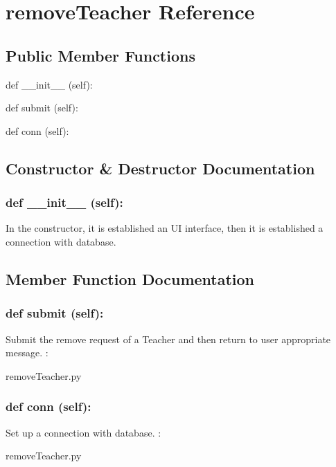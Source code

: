 \hypertarget{removeTeacher}{\section{removeTeacher Reference}
\label{removeTeacher}
}
\subsection*{Public Member Functions}
\begin{DoxyCompactItemize}
\item 
def {\_\_init\_\_} (self):
\item 
def {submit} (self):
\item 
def {conn} (self):
\end{DoxyCompactItemize}

\subsection{Constructor \& Destructor Documentation}
\hypertarget{class_poly_aa3def076b74bed67904976ad4f9fe9b1}{
\subsubsection[{def __init__ (self):}]{\setlength{\rightskip}{0pt plus 5cm}def {\_\_init\_\_} (self): 
}}
In the constructor, it is established an UI interface, then it is  established a connection with database.

\subsection{Member Function Documentation}
\hypertarget{class_poly_a14a7ad77ce612b0c54f531d307ee4b39}{
\subsubsection[{def submit (self):}]{\setlength{\rightskip}{0pt plus 5cm}def {submit} (self):}}\label{class_poly_a14a7ad77ce612b0c54f531d307ee4b39}
Submit the remove request of a Teacher and then return to user appropriate message.
:\begin{DoxyCompactItemize}
\item 
removeTeacher.\-py\end{DoxyCompactItemize}


\hypertarget{class_poly_a14a7ad77ce612b0c54f531d307ee4b39}{
\subsubsection[{def conn (self):}]{\setlength{\rightskip}{0pt plus 5cm}def {conn} (self):}}\label{class_poly_a14a7ad77ce612b0c54f531d307ee4b39}
Set up a connection with database.
:\begin{DoxyCompactItemize}
\item 
removeTeacher.\-py\end{DoxyCompactItemize}


